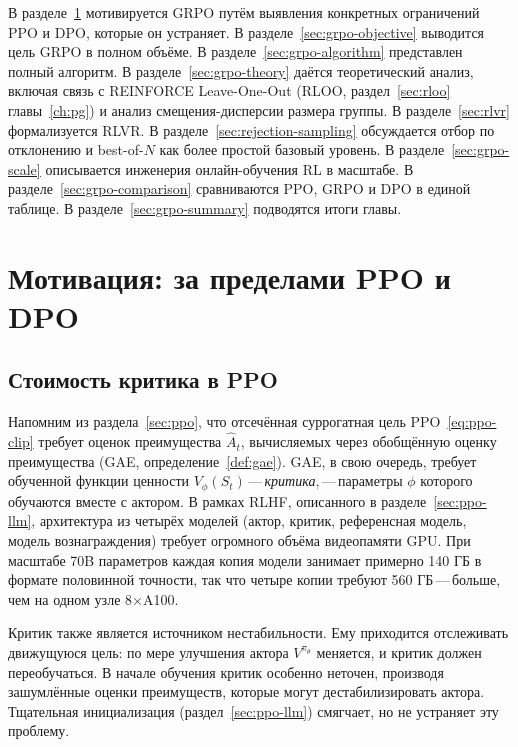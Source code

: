 В разделе~\ref{sec:grpo-motivation} мотивируется GRPO путём выявления конкретных ограничений PPO и DPO, которые он устраняет. В разделе~\ref{sec:grpo-objective} выводится цель GRPO в полном объёме. В разделе~\ref{sec:grpo-algorithm} представлен полный алгоритм. В разделе~\ref{sec:grpo-theory} даётся теоретический анализ, включая связь с REINFORCE Leave-One-Out (RLOO, раздел~\ref{sec:rloo} главы~\ref{ch:pg}) и анализ смещения-дисперсии размера группы. В разделе~\ref{sec:rlvr} формализуется RLVR. В разделе~\ref{sec:rejection-sampling} обсуждается отбор по отклонению и best-of-$N$ как более простой базовый уровень. В разделе~\ref{sec:grpo-scale} описывается инженерия онлайн-обучения RL в масштабе. В разделе~\ref{sec:grpo-comparison} сравниваются PPO, GRPO и DPO в единой таблице. В разделе~\ref{sec:grpo-summary} подводятся итоги главы.

\section{Мотивация: за пределами PPO и DPO}
\label{sec:grpo-motivation}

\subsection{Стоимость критика в PPO}

Напомним из раздела~\ref{sec:ppo}, что отсечённая суррогатная цель PPO~\eqref{eq:ppo-clip} требует оценок преимущества $\hat{A}_t$, вычисляемых через обобщённую оценку преимущества (GAE, определение~\ref{def:gae}). GAE, в свою очередь, требует обученной функции ценности $V_\phi(S_t)$\,---\,\emph{критика},\,---\,параметры $\phi$ которого обучаются вместе с актором. В рамках RLHF, описанного в разделе~\ref{sec:ppo-llm}, архитектура из четырёх моделей (актор, критик, референсная модель, модель вознаграждения) требует огромного объёма видеопамяти GPU. При масштабе 70B параметров каждая копия модели занимает примерно 140 ГБ в формате половинной точности, так что четыре копии требуют 560 ГБ\,---\,больше, чем на одном узле 8$\times$A100.

Критик также является источником нестабильности. Ему приходится отслеживать движущуюся цель: по мере улучшения актора $V^{\pi_\theta}$ меняется, и критик должен переобучаться. В начале обучения критик особенно неточен, производя зашумлённые оценки преимуществ, которые могут дестабилизировать актора. Тщательная инициализация (раздел~\ref{sec:ppo-llm}) смягчает, но не устраняет эту проблему.


